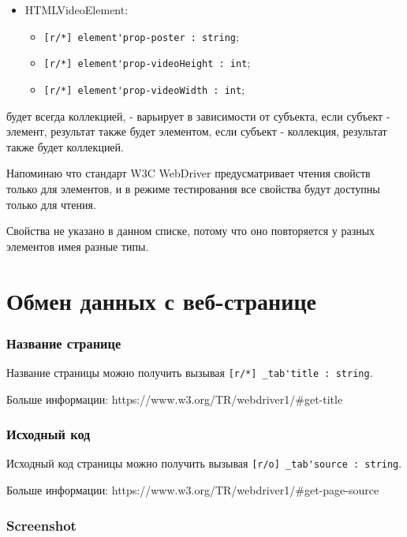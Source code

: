 \documentclass[a4paper, 14pt]{extarticle}
\newenvironment{icItems}
	{ \begin{itemize} [noitemsep,nolistsep] }
	{ \end{itemize} }
\begin{document}
\begin{icItems}
	\item HTMLVideoElement:
	\begin{icItems}
		\item \lstinline|[r/*] element'prop-poster : string|;
		\item \lstinline|[r/*] element'prop-videoHeight : int|;
		\item \lstinline|[r/*] element'prop-videoWidth : int|;
	\end{icItems}
	
\end{icItems}

 будет всегда коллекцией,  - варьирует в зависимости от субъекта, если субъект - элемент, результат также будет элементом, если субъект - коллекция, результат также будет коллекцией. 

Напоминаю что стандарт W3C WebDriver предусматривает чтения свойств только для элементов, и в режиме тестирования все свойства будут доступны только для чтения.

Свойства  не указано в данном списке, потому что оно повторяется у разных элементов имея разные типы.

\newpage
\section{Обмен данных с веб-странице}
\label{dataexchange}

\subsubsection{Название странице}

Название страницы можно получить вызывая \lstinline|[r/*] _tab'title : string|.

Больше информации: https://www.w3.org/TR/webdriver1/\#get-title

\subsubsection{Исходный код}

Исходный код страницы можно получить вызывая \lstinline|[r/o] _tab'source : string|.

Больше информации: https://www.w3.org/TR/webdriver1/\#get-page-source

\subsubsection{Screenshot}
\end{document}
